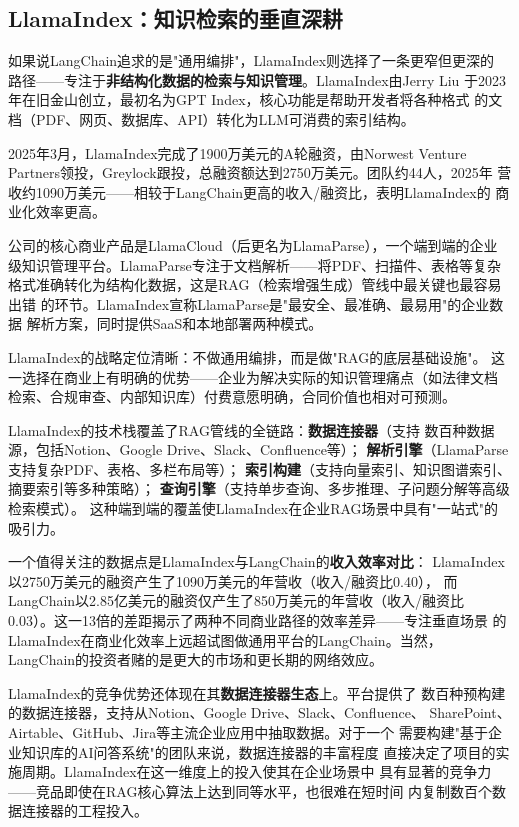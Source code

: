 \subsection{LlamaIndex：知识检索的垂直深耕}
\label{subsec:llamaindex}

如果说LangChain追求的是"通用编排"，LlamaIndex则选择了一条更窄但更深的
路径——专注于\textbf{非结构化数据的检索与知识管理}。LlamaIndex由Jerry Liu
于2023年在旧金山创立，最初名为GPT Index，核心功能是帮助开发者将各种格式
的文档（PDF、网页、数据库、API）转化为LLM可消费的索引结构。

2025年3月，LlamaIndex完成了1900万美元的A轮融资，由Norwest Venture
Partners领投，Greylock跟投，总融资额达到2750万美元。团队约44人，2025年
营收约1090万美元——相较于LangChain更高的收入/融资比，表明LlamaIndex的
商业化效率更高。

公司的核心商业产品是LlamaCloud（后更名为LlamaParse），一个端到端的企业
级知识管理平台。LlamaParse专注于文档解析——将PDF、扫描件、表格等复杂
格式准确转化为结构化数据，这是RAG（检索增强生成）管线中最关键也最容易出错
的环节。LlamaIndex宣称LlamaParse是"最安全、最准确、最易用"的企业数据
解析方案，同时提供SaaS和本地部署两种模式。

LlamaIndex的战略定位清晰：不做通用编排，而是做"RAG的底层基础设施"。
这一选择在商业上有明确的优势——企业为解决实际的知识管理痛点（如法律文档
检索、合规审查、内部知识库）付费意愿明确，合同价值也相对可预测。

LlamaIndex的技术栈覆盖了RAG管线的全链路：\textbf{数据连接器}（支持
数百种数据源，包括Notion、Google Drive、Slack、Confluence等）；
\textbf{解析引擎}（LlamaParse支持复杂PDF、表格、多栏布局等）；
\textbf{索引构建}（支持向量索引、知识图谱索引、摘要索引等多种策略）；
\textbf{查询引擎}（支持单步查询、多步推理、子问题分解等高级检索模式）。
这种端到端的覆盖使LlamaIndex在企业RAG场景中具有"一站式"的吸引力。

一个值得关注的数据点是LlamaIndex与LangChain的\textbf{收入效率对比}：
LlamaIndex以2750万美元的融资产生了1090万美元的年营收（收入/融资比0.40），
而LangChain以2.85亿美元的融资仅产生了850万美元的年营收（收入/融资比
0.03）。这一13倍的差距揭示了两种不同商业路径的效率差异——专注垂直场景
的LlamaIndex在商业化效率上远超试图做通用平台的LangChain。当然，
LangChain的投资者赌的是更大的市场和更长期的网络效应。

LlamaIndex的竞争优势还体现在其\textbf{数据连接器生态}上。平台提供了
数百种预构建的数据连接器，支持从Notion、Google Drive、Slack、Confluence、
SharePoint、Airtable、GitHub、Jira等主流企业应用中抽取数据。对于一个
需要构建"基于企业知识库的AI问答系统"的团队来说，数据连接器的丰富程度
直接决定了项目的实施周期。LlamaIndex在这一维度上的投入使其在企业场景中
具有显著的竞争力——竞品即使在RAG核心算法上达到同等水平，也很难在短时间
内复制数百个数据连接器的工程投入。

